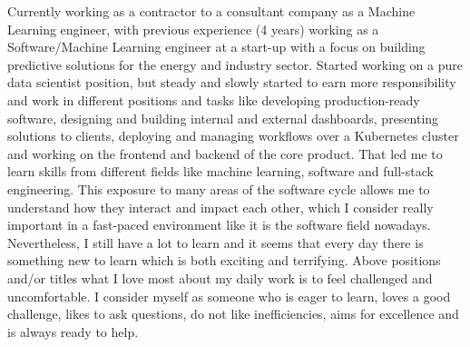 

\begin{cvparagraph}
Currently working as a contractor to a consultant company as a Machine Learning engineer, with previous experience (4 years) working as a Software/Machine Learning engineer at a start-up with a focus on building predictive solutions for the energy and industry sector. Started working on a pure data scientist position, but steady and slowly started to earn more responsibility and work in different positions and tasks like developing production-ready software, designing and building internal and
  external dashboards, presenting solutions to clients, deploying and managing workflows over a Kubernetes cluster and working on the frontend and backend of the core product. That led me to learn skills from different fields like machine learning, software and full-stack engineering. This exposure to many areas of the software cycle allows me to understand how they interact and impact each other, which I consider really important in a fast-paced environment like it is the software field
  nowadays. Nevertheless, I still have a lot to learn and it seems that every day there is something new to learn which is both exciting and terrifying. Above positions and/or titles what I love most about my daily work is to feel challenged and uncomfortable. I consider myself as someone who is eager to learn, loves a good challenge, likes to ask questions, do not like inefficiencies, aims for excellence and is always ready to help.
\end{cvparagraph}
